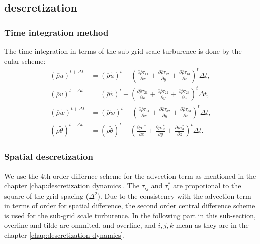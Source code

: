 \subsection{descretization}

\subsubsection{Time integration method}
The time integration in terms of the sub-grid scale turburence
is done by the eular scheme:
\begin{align}
  \left(\overline{\rho} \widetilde{u}\right)^{t+\Delta t}
  &= \left(\overline{\rho} \widetilde{u}\right)^t
  - \left(
    \frac{\partial \overline{\rho}\tau_{11}}{\partial x}
  + \frac{\partial \overline{\rho}\tau_{12}}{\partial y}
  + \frac{\partial \overline{\rho}\tau_{13}}{\partial z}
  \right)^t
  \Delta t, \\
  \left(\overline{\rho} \widetilde{v}\right)^{t+\Delta t}
  &= \left(\overline{\rho} \widetilde{v}\right)^t
  - \left(
    \frac{\partial \overline{\rho}\tau_{21}}{\partial x}
  + \frac{\partial \overline{\rho}\tau_{22}}{\partial y}
  + \frac{\partial \overline{\rho}\tau_{23}}{\partial z}
  \right)^t
  \Delta t, \\
  \left(\overline{\rho} \widetilde{w}\right)^{t+\Delta t}
  &= \left(\overline{\rho} \widetilde{w}\right)^t
  - \left(
    \frac{\partial \overline{\rho}\tau_{31}}{\partial x}
  + \frac{\partial \overline{\rho}\tau_{32}}{\partial y}
  + \frac{\partial \overline{\rho}\tau_{33}}{\partial z}
  \right)^t
  \Delta t, \\
  \left(\overline{\rho} \widetilde{\theta}\right)^{t+\Delta t}
  &= \left(\overline{\rho} \widetilde{\theta}\right)^t
  - \left(
    \frac{\partial \overline{\rho}\tau^*_1}{\partial x}
  + \frac{\partial \overline{\rho}\tau^*_2}{\partial y}
  + \frac{\partial \overline{\rho}\tau^*_3}{\partial z}
  \right)^t
  \Delta t.
\end{align}

\subsubsection{Spatial descretization}
We use the 4th order differnce scheme for the advection term as mentioned
in the chapter \ref{chap:descretization dynamics}.
The $\tau_{ij}$ and $\tau^*_{i}$ are propotional to
the square of the grid spacing ($\Delta^2$).
Due to the consistency with the advection term
in terms of order for spatial difference,
the second order central difference scheme
is used for the sub-grid scale turburence.
In the following part in this sub-section,
overline and tilde are ommited,
and overline, and $i,j,k$ mean
as they are in the chapter \ref{chap:descretization dynamics}.

